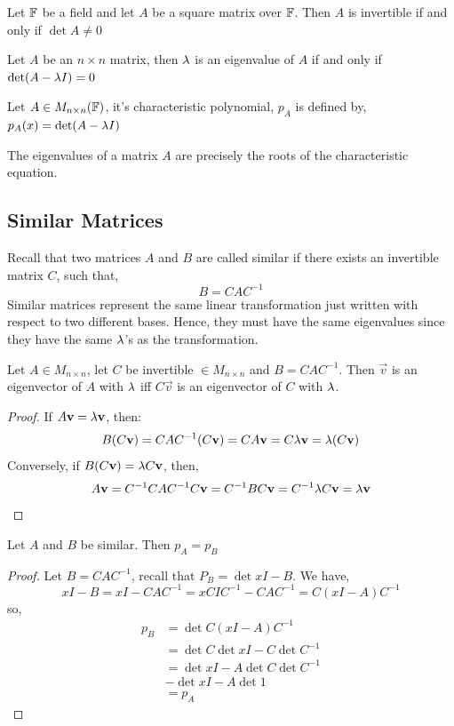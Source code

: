 \documentclass{article}
\begin{document}
\begin{nlemma}
  Let $\mathbb{F}$ be a field and let $A$ be a square matrix over $\mathbb{F}$. Then $A$ is invertible if and only if $\det A \ne 0$
\end{nlemma}

\begin{nlemma}
  Let $A$ be an $n \times n$ matrix, then $\lambda$ is an eigenvalue of $A$ if and only if $\det (A - \lambda I) = 0$
\end{nlemma}

\begin{ndefi}
  Let $A \in M_{n\times n}(\mathbb{F})$, it's characteristic polynomial, $p_A$ is defined by, $p_A (x) = \det(A - \lambda I)$
\end{ndefi}

\begin{nthm}
  The eigenvalues of a matrix $A$ are precisely the roots of the characteristic equation.
\end{nthm}

\subsection{Similar Matrices}
Recall that two matrices $A$ and $B$ are called similar if there exists an invertible matrix $C$, such that,
$$ B = CAC^{-1} $$
Similar matrices represent the same linear transformation just written with respect to two different bases. Hence, they must have the same eigenvalues since they have the same $\lambda$'s as the transformation.

\begin{nthm}
  Let $A \in M_{n\times n}$, let $C$ be invertible $\in M_{n\times n}$ and $B = CAC^{-1}$. Then $\vec v$ is an eigenvector of $A$ with $\lambda $ iff $C\vec v$ is an eigenvector of $C$ with $\lambda$.
\end{nthm}
\begin{proof}
  If $A\boldsymbol{\mathbf{v}} = \lambda\boldsymbol{\mathbf{v}}$, then:
  $$ B(C\boldsymbol{\mathbf{v}}) = CAC^{-1}(C\boldsymbol{\mathbf{v}}) = CA\boldsymbol{\mathbf{v}} = C\lambda\boldsymbol{\mathbf{v}} = \lambda (C\boldsymbol{\mathbf{v}})$$
  Conversely, if $B(C\boldsymbol{\mathbf{v}}) = \lambda C\boldsymbol{\mathbf{v}}$, then,
  $$ A\boldsymbol{\mathbf{v}} = C^{-1}CAC^{-1}C\boldsymbol{\mathbf{v}} = C^{-1}BC\boldsymbol{\mathbf{v}} = C^{-1}\lambda C\boldsymbol{\mathbf{v}} = \lambda \boldsymbol{\mathbf{v}} $$
\end{proof}

\begin{nlemma}
  Let $A$ and $B$ be similar. Then $p_A = p_B$
\end{nlemma}
\begin{proof}
  Let $B = CAC^{-1}$, recall that $P_B = \det xI - B$. We have,
  $$ xI - B = xI - CAC^{-1} = xCIC^{-1} - CAC^{-1} = C(xI - A)C^{-1}  $$
  so,
  \begin{align*}
    p_B &= \det C(xI - A)C^{-1}\\
    &= \det C \det xI - C \det C^{-1}\\
    &= \det xI - A\det C \det C^{-1}\\
    &- \det xI - A\det 1\\
    &= p_A
  \end{align*}
\end{proof}
\end{document}
